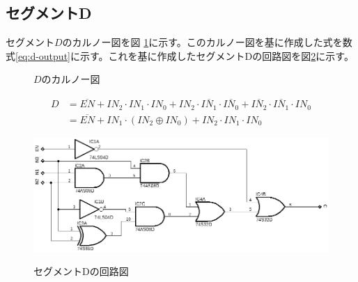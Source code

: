 \documentclass[a4paper,11pt,dvipdfmx]{jsarticle}
\begin{document}
\subsection{セグメントD}
セグメント$D$のカルノー図を図 \ref{fig:karnoD}に示す。このカルノー図を基に作成した式を数式\eqref{eq:d-output}に示す。これを基に作成したセグメントDの回路図を図\ref{fig:segD}に示す。
\begin{figure}[htbp]
  \centering
\caption{\(D\)のカルノー図}
\label{fig:karnoD}
\end{figure}
\begin{align}
  D &= \overline{EN} + IN_2 \cdot IN_1 \cdot IN_0 + IN_2 \cdot \overline{IN_1} \cdot \overline{IN_0} + \overline{IN_2} \cdot \overline{IN_1} \cdot IN_0\label{eq:d-output}\\
  &= \overline{EN} + IN_1 \cdot (IN_2 \oplus IN_0) + IN_2 \cdot IN_1 \cdot IN_0\label{eq:d-output1}
\end{align}
\begin{figure}[htbp]
  \centering
  \includegraphics{./images/D.png}
  \label{fig:segD}
  \caption{セグメントDの回路図}
\end{figure}
\newpage
\end{document}
